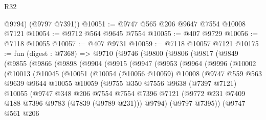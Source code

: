 \begin{lexlean}{R32}
\begin{coremodule}
        @9794)
      (@9797 @7391))
@10051 := @9747 @565 @206 @9647 @7554 @10008 @7121
@10054 := @9712 @564 @9645 @7554
@10055 := @407 @9729
@10056 := @7118 @10055
@10057 := @407 @9731
@10059 := @7118 @10057 @7121
@10175 := fun (digest : @7368) =>
  @9710
    (@9746
      (@9800
        (@9806
          (@9817
            (@9849
              (@9855
                (@9866
                  (@9898
                    (@9904
                      (@9915
                        (@9947
                          (@9953
                            (@9964
                              (@9996
                                (@10002
                                  (@10013
                                    (@10045
                                      (@10051
                                        (@10054
                                          (@10056 @10059)
                                          @10008
                                          (@9747
                                            @559
                                            @563
                                            @9639
                                            @9644
                                            @10055
                                            @10059
                                            (@9755
                                              @350
                                              @7556
                                              @9638
                                              (@7397 @7121)
                                              @10055
                                              (@9747
                                                @348
                                                @206
                                                @7554
                                                @7554
                                                @7396
                                                @7121
                                                (@9772
                                                  @231
                                                  @7409
                                                  @188
                                                  @7396
                                                  @9783
                                                  (@7839 (@9789 @231)))
                                                @9794)
                                              (@9797 @7395))
                                            (@9747
                                              @561
                                              @206

\end{coremodule}
\end{lexlean}
